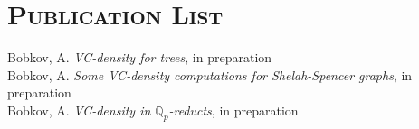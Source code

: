 \documentclass[margin, 10pt]{res} %
\begin{document}
\section{\textsc{Publication List}}

Bobkov, A. {\it VC-density for trees}, in preparation  \\
Bobkov, A. {\it Some VC-density computations for Shelah-Spencer graphs}, in preparation \\
Bobkov, A. {\it VC-density in $\mathbb{Q}_p$-reducts}, in preparation
\end{document}
